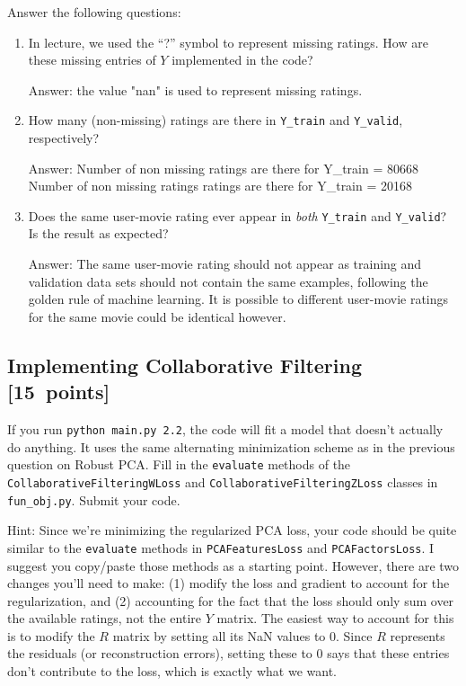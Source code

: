 \documentclass{article}
\newcommand{\blu}[1]{{\textcolor{blu}{#1}}}
\newcommand{\gre}[1]{\textcolor{gre}{#1}}
\newcommand\ans[1]{\par\gre{Answer: #1}}
\let\ask\blu
\newcommand\pts[1]{\textcolor{pointscolour}{[#1~points]}}
\begin{document}
\ask{Answer the following questions:}

\begin{enumerate}
\item In lecture, we used the ``?'' symbol to represent missing ratings. How are these missing entries of $Y$ implemented in the code?
\ans{the value "nan" is used to represent missing ratings.}
\item How many (non-missing) ratings are there in \texttt{Y\_train} and \texttt{Y\_valid}, respectively?
\ans{\newline Number of non missing ratings are there for Y\_train = 80668 \newline Number of non missing ratings ratings are there for Y\_train = 20168}
\item Does the same user-movie rating ever appear in \emph{both} \texttt{Y\_train} and \texttt{Y\_valid}? Is the result as expected?
\ans{ The same user-movie rating should not appear as training and validation data sets should not contain the same examples, following the golden rule of machine learning. It is possible to different user-movie ratings for the same movie could be identical however.}
\end{enumerate}
\newpage

\subsection{Implementing Collaborative Filtering \pts{15}}

If you run \texttt{python main.py 2.2}, the code will fit a model that doesn't actually do anything. It uses the same alternating minimization scheme as in the previous question on Robust PCA. \ask{Fill in the \texttt{evaluate} methods of the \texttt{CollaborativeFilteringWLoss} and \texttt{CollaborativeFilteringZLoss} classes in \texttt{fun\_obj.py}. Submit your code.}

Hint: Since we're minimizing the regularized PCA loss, your code should be quite similar to the \texttt{evaluate} methods in \texttt{PCAFeaturesLoss} and \texttt{PCAFactorsLoss}. I suggest you copy/paste those methods as a starting point. However, there are two changes you'll need to make: (1) modify the loss and gradient to account for the regularization, and (2) accounting for the fact that the loss should only sum over the available ratings, not the entire $Y$ matrix. The easiest way to account for this is to modify the $R$ matrix by setting all its NaN values to 0. Since $R$ represents the residuals (or reconstruction errors), setting these to 0 says that these entries don't contribute to the loss, which is exactly what we want.
\end{document}
